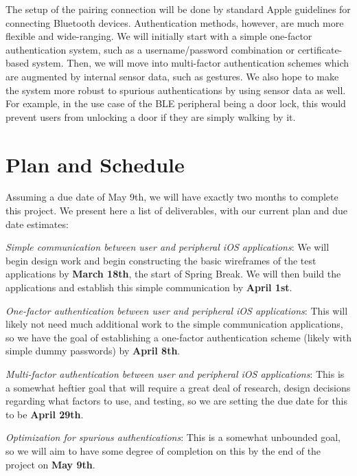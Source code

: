 \documentclass[twoside]{article}
\begin{document}
\begin{multicols}{2}
The setup of the pairing connection will be done by standard Apple guidelines for connecting
Bluetooth devices. Authentication methods, however, are much more flexible and wide-ranging.
We will initially start with a simple one-factor authentication system, such as a username/password
combination or certificate-based system. Then, we will move into multi-factor authentication
schemes which are augmented by internal sensor data, such as gestures. We also hope to make the
system more robust to spurious authentications by using sensor data as well. For example, in the
use case of the BLE peripheral being a door lock, this would prevent users from unlocking a door
if they are simply walking by it.


\section{Plan and Schedule}

Assuming a due date of May 9th, we will have exactly two months to complete this project. We present
here a list of deliverables, with our current plan and due date estimates:
\begin{compactitem}
    \item{\textit{Simple communication between user and peripheral iOS applications}: We will begin design work and begin constructing the basic wireframes of the test applications by \textbf{March 18th}, the start of Spring Break. We will then build the applications and establish this simple communication by \textbf{April 1st}.}
    \item{\textit{One-factor authentication between user and peripheral iOS applications}: This will likely not need much additional work to the simple communication applications, so we have the goal of establishing a one-factor authentication scheme (likely with simple dummy passwords) by \textbf{April 8th}.}
    \item{\textit{Multi-factor authentication between user and peripheral iOS applications}: This is a somewhat heftier goal that will require a great deal of research, design decisions regarding what factors to use, and testing, so we are setting the due date for this to be \textbf{April 29th}.}
    \item{\textit{Optimization for spurious authentications}: This is a somewhat unbounded goal, so we will aim to have some degree of completion on this by the end of the project on \textbf{May 9th}.}
\end{compactitem}


\end{multicols}
\end{document}
